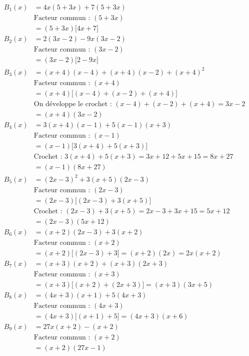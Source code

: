 \documentclass[11pt]{article}
\begin{document}
	\[
	\begin{aligned}
		B_1(x) &= 4x(5+3x)+7(5+3x)\\
		&\text{Facteur commun : } (5+3x)\\
		&= (5+3x)\big[4x+7\big]\\[4pt]
		B_2(x) &= 2(3x-2)-9x(3x-2)\\
		&\text{Facteur commun : } (3x-2)\\
		&= (3x-2)\big[2-9x\big]\\[4pt]
		B_3(x) &= (x+4)(x-4)+(x+4)(x-2)+(x+4)^2\\
		&\text{Facteur commun : } (x+4)\\
		&= (x+4)\big[(x-4)+(x-2)+(x+4)\big]\\
		&\text{On développe le crochet : } (x-4)+(x-2)+(x+4) = 3x-2\\
		&= (x+4)(3x-2)\\[4pt]
		B_4(x) &= 3(x+4)(x-1)+5(x-1)(x+3)\\
		&\text{Facteur commun : } (x-1)\\
		&= (x-1)\big[3(x+4)+5(x+3)\big]\\
		&\text{Crochet : } 3(x+4)+5(x+3) = 3x+12+5x+15 = 8x+27\\
		&= (x-1)(8x+27)\\[4pt]
		B_5(x) &= (2x-3)^2+3(x+5)(2x-3)\\
		&\text{Facteur commun : } (2x-3)\\
		&= (2x-3)\big[(2x-3)+3(x+5)\big]\\
		&\text{Crochet : } (2x-3)+3(x+5) = 2x-3+3x+15 = 5x+12\\
		&= (2x-3)(5x+12)\\[4pt]
		B_6(x) &= (x+2)(2x-3)+3(x+2)\\
		&\text{Facteur commun : } (x+2)\\
		&= (x+2)\big[(2x-3)+3\big] = (x+2)(2x) = 2x(x+2)\\[4pt]
		B_7(x) &= (x+3)(x+2)+(x+3)(2x+3)\\
		&\text{Facteur commun : } (x+3)\\
		&= (x+3)\big[(x+2)+(2x+3)\big] = (x+3)(3x+5)\\[4pt]
		B_8(x) &= (4x+3)(x+1)+5(4x+3)\\
		&\text{Facteur commun : } (4x+3)\\
		&= (4x+3)\big[(x+1)+5\big] = (4x+3)(x+6)\\[4pt]
		B_9(x) &= 27x(x+2)-(x+2)\\
		&\text{Facteur commun : } (x+2)\\
		&= (x+2)(27x-1)\\[4pt]

\end{aligned}\]
\end{document}

